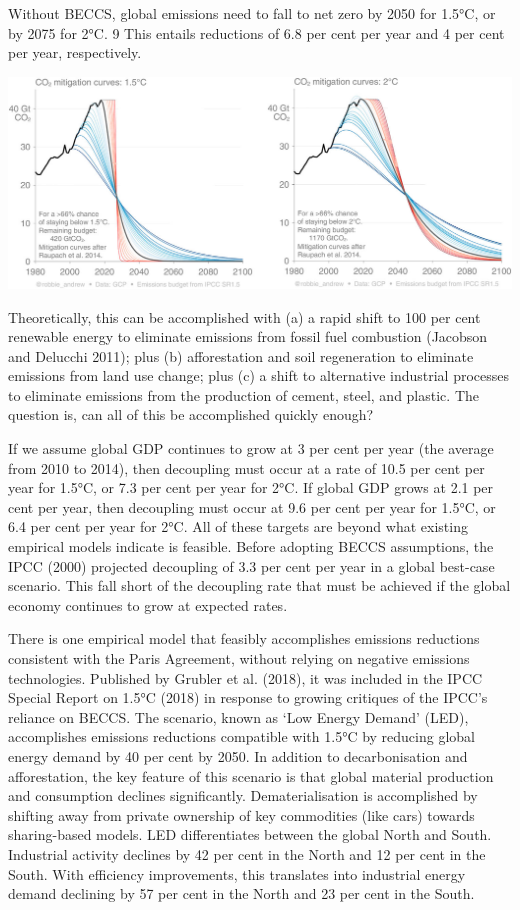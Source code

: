 \documentclass[
]{book}
\begin{document}
Without BECCS, global emissions need to fall to net zero by 2050 for 1.5°C, or by 2075
for 2°C. 9 This entails reductions of 6.8 per cent per year and 4 per cent per year, respectively.

\includegraphics{fig/Hickel_Carbon_Budget.png}

Theoretically, this can be accomplished with (a) a rapid shift to 100 per cent renewable
energy to eliminate emissions from fossil fuel combustion (Jacobson and Delucchi 2011); plus (b)
afforestation and soil regeneration to eliminate emissions from land use change; plus (c) a shift to
alternative industrial processes to eliminate emissions from the production of cement, steel, and
plastic. The question is, can all of this be accomplished quickly enough?

If we assume global GDP continues to grow at 3 per cent per year (the average from 2010 to 2014),
then decoupling must occur at a rate of 10.5 per cent per year for 1.5°C,
or 7.3 per cent per year for 2°C.
If global GDP grows at 2.1 per cent per year, then decoupling must occur at 9.6 per cent per
year for 1.5°C, or 6.4 per cent per year for 2°C.
All of these targets are beyond what existing empirical models indicate is feasible.
Before adopting BECCS assumptions, the IPCC (2000) projected decoupling
of 3.3 per cent per year in a global best-case scenario.
This fall short of the decoupling rate that must be achieved if the global economy continues
to grow at expected rates.

There is one empirical model that feasibly accomplishes emissions reductions consistent with the
Paris Agreement, without relying on negative emissions technologies. Published by Grubler et al.
(2018), it was included in the IPCC Special Report on 1.5°C (2018) in response to growing critiques
of the IPCC's reliance on BECCS. The scenario, known as `Low Energy Demand' (LED), accomplishes
emissions reductions compatible with 1.5°C by reducing global energy demand by 40 per cent by
2050. In addition to decarbonisation and afforestation, the key feature of this scenario is that
global material production and consumption declines significantly.
Dematerialisation is accomplished by shifting
away from private ownership of key commodities (like cars) towards sharing-based models. LED
differentiates between the global North and South. Industrial activity declines by 42 per cent in
the North and 12 per cent in the South. With efficiency improvements, this translates into industrial
energy demand declining by 57 per cent in the North and 23 per cent in the South.
\end{document}
